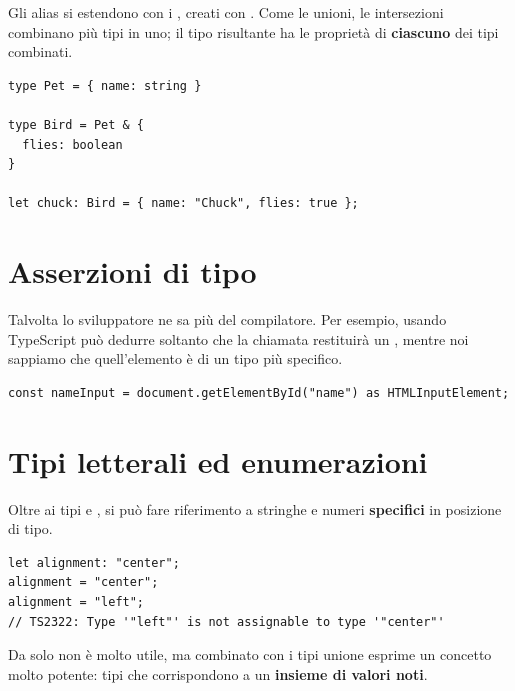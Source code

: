 Gli alias si estendono con i , creati con \code{\&}.
Come le unioni, le intersezioni combinano più tipi in uno; il tipo risultante
ha le proprietà di \textbf{ciascuno} dei tipi combinati.

\begin{lstlisting}[style=ts, name=intersection.ts]
type Pet = { name: string }

type Bird = Pet & {
  flies: boolean
}

let chuck: Bird = { name: "Chuck", flies: true };
\end{lstlisting}

\section{Asserzioni di tipo}

Talvolta lo sviluppatore ne sa più del compilatore. Per esempio, usando
 TypeScript può dedurre soltanto che la chiamata
restituirà un , mentre noi sappiamo che quell'elemento è di un
tipo più specifico.

\begin{lstlisting}[style=ts]
const nameInput = document.getElementById("name") as HTMLInputElement;
\end{lstlisting}


\section{Tipi letterali ed enumerazioni}

Oltre ai tipi  e , si può fare riferimento a stringhe
e numeri \textbf{specifici} in posizione di tipo.

\begin{lstlisting}[style=ts, name=literals.ts]
let alignment: "center";
alignment = "center";
alignment = "left";
// TS2322: Type '"left"' is not assignable to type '"center"'
\end{lstlisting}

Da solo non è molto utile, ma combinato con i tipi unione esprime un concetto
molto potente: tipi che corrispondono a un \textbf{insieme di valori noti}.

